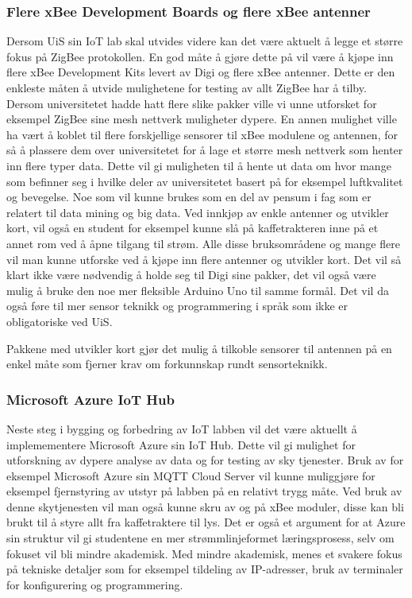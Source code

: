 \documentclass{article}
\begin{document}
\subsubsection{Flere xBee Development Boards og flere xBee antenner}
Dersom UiS sin IoT lab skal utvides videre kan det være aktuelt å legge et større fokus på ZigBee protokollen. En god måte å gjøre dette på vil være å kjøpe inn flere xBee Development Kits levert av Digi og flere xBee antenner. Dette er den enkleste måten å utvide mulighetene for testing av allt ZigBee har å tilby. Dersom universitetet hadde hatt flere slike pakker ville vi unne utforsket for eksempel ZigBee sine mesh nettverk muligheter dypere. En annen mulighet ville ha vært å koblet til flere forskjellige sensorer til xBee modulene og antennen, for så å plassere dem over universitetet for å lage et større mesh nettverk som henter inn flere typer data. Dette vil gi muligheten til å hente ut data om hvor mange som befinner seg i hvilke deler av universitetet basert på for eksempel luftkvalitet og bevegelse. Noe som vil kunne brukes som en del av pensum i fag som er relatert til data mining og big data. Ved innkjøp av enkle antenner og utvikler kort, vil også en student for eksempel kunne slå på kaffetrakteren inne på et annet rom ved å åpne tilgang til strøm. Alle disse bruksområdene og mange flere vil man kunne utforske ved å kjøpe inn flere antenner og utvikler kort. Det vil så klart ikke være nødvendig å holde seg til Digi sine pakker, det vil også være mulig å bruke den noe mer fleksible Arduino Uno til samme formål. Det vil da også føre til mer sensor teknikk og programmering i språk som ikke er obligatoriske ved UiS. 

Pakkene med utvikler kort gjør det mulig å tilkoble sensorer til antennen på en enkel måte som fjerner krav om forkunnskap rundt sensorteknikk. 


\subsubsection{Microsoft Azure IoT Hub}
Neste steg i bygging og forbedring av IoT labben vil det være aktuellt å implemementere Microsoft Azure sin IoT Hub. Dette vil gi mulighet for utforskning av dypere analyse av data og for testing av sky tjenester. Bruk av for eksempel Microsoft Azure sin MQTT Cloud Server vil kunne muliggjøre for eksempel fjernstyring av utstyr på labben på en relativt trygg måte. Ved bruk av denne skytjenesten vil man også kunne skru av og på xBee moduler, disse kan bli brukt til å styre allt fra kaffetraktere til lys. Det er også et argument for at Azure sin struktur vil gi studentene en mer strømmlinjeformet læringsprosess, selv om fokuset vil bli mindre akademisk. Med mindre akademisk, menes et svakere fokus på tekniske detaljer som for eksempel tildeling av IP-adresser, bruk av terminaler for konfigurering og programmering. 
\end{document}
